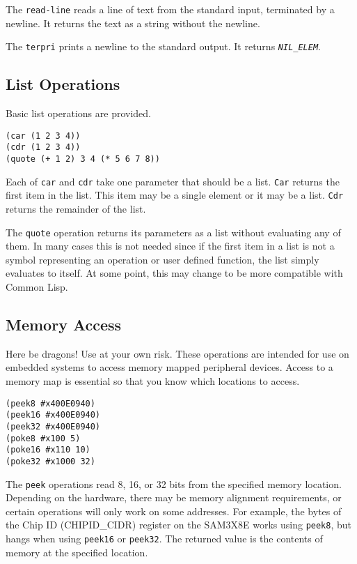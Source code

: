 \documentclass[10pt, openany]{book}
\newcommand{\function}[1]{\texttt{#1}}
\newcommand{\constant}[1]{\emph{\texttt{#1}}}
\newcommand{\cl}{Common Lisp}
\begin{document}
The \function{read-line} reads a line of text from the standard input, terminated by a newline.  It returns the text as a string without the newline.

The \function{terpri} prints a newline to the standard output.  It returns \constant{NIL\_ELEM}.

\subsection{List Operations}
Basic list operations are provided.
\begin{lstlisting}
(car (1 2 3 4))
(cdr (1 2 3 4))
(quote (+ 1 2) 3 4 (* 5 6 7 8))
\end{lstlisting}

Each of \function{car} and \function{cdr} take one parameter that should be a list.  \function{Car} returns the first item in the list.  This item may be a single element or it may be a list.  \function{Cdr} returns the remainder of the list.

The \function{quote} operation returns its parameters as a list without evaluating any of them.  In many cases this is not needed since if the first item in a list is not a symbol representing an operation or user defined function, the list simply evaluates to itself.  At some point, this may change to be more compatible with \cl.

\subsection{Memory Access}
Here be dragons!  Use at your own risk.  These operations are intended for use on embedded systems to access memory mapped peripheral devices.  Access to a memory map is essential so that you know which locations to access.
\begin{lstlisting}
(peek8 #x400E0940)
(peek16 #x400E0940)
(peek32 #x400E0940)
(poke8 #x100 5)
(poke16 #x110 10)
(poke32 #x1000 32)
\end{lstlisting}

The \function{peek} operations read 8, 16, or 32 bits from the specified memory location.  Depending on the hardware, there may be memory alignment requirements, or certain operations will only work on some addresses.  For example, the bytes of the Chip ID (CHIPID\_CIDR) register on the SAM3X8E works using \function{peek8}, but hangs when using \function{peek16} or \function{peek32}.  The returned value is the contents of memory at the specified location.
\end{document}
